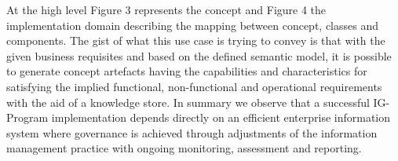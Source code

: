 At the high level Figure 3 represents the concept and  Figure 4  the implementation domain describing the mapping between concept, classes and components. The gist of what this use case is trying to convey is that with the given business requisites and based on the defined semantic model, it is possible to generate concept artefacts having the capabilities and characteristics for satisfying the implied functional, non-functional and operational requirements with the aid of a knowledge store. 
In summary we observe that a successful IG-Program implementation depends directly on an efficient enterprise information system where governance is achieved through adjustments of the information management practice with ongoing monitoring, assessment and reporting.
